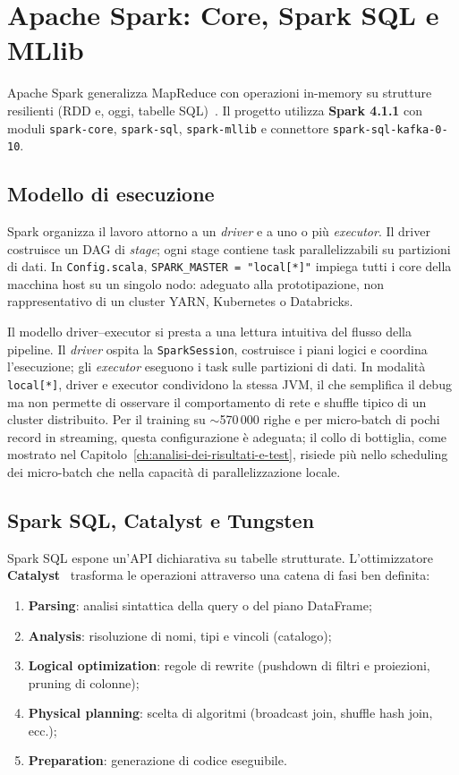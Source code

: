\section{Apache Spark: Core, Spark SQL e MLlib}\label{sec:spark}

Apache Spark generalizza MapReduce con operazioni in-memory su strutture resilienti (RDD e, oggi, tabelle SQL)~\cite{zaharia2010spark,zaharia2016apache}.
Il progetto utilizza \textbf{Spark 4.1.1} con moduli \texttt{spark-core}, \texttt{spark-sql}, \texttt{spark-mllib} e connettore \texttt{spark-sql-kafka-0-10}.

\subsection{Modello di esecuzione}

Spark organizza il lavoro attorno a un \emph{driver} e a uno o più \emph{executor}.
Il driver costruisce un DAG di \emph{stage}; ogni stage contiene task parallelizzabili su partizioni di dati.
In \texttt{Config.scala}, \texttt{SPARK\_MASTER = "local[*]"} impiega tutti i core della macchina host su un singolo nodo: adeguato alla prototipazione, non rappresentativo di un cluster YARN, Kubernetes o Databricks.

Il modello driver--executor si presta a una lettura intuitiva del flusso della pipeline.
Il \emph{driver} ospita la \texttt{SparkSession}, costruisce i piani logici e coordina l'esecuzione; gli \emph{executor} eseguono i task sulle partizioni di dati.
In modalità \texttt{local[*]}, driver e executor condividono la stessa JVM, il che semplifica il debug ma non permette di osservare il comportamento di rete e shuffle tipico di un cluster distribuito.
Per il training su $\sim$570\,000 righe e per micro-batch di pochi record in streaming, questa configurazione è adeguata; il collo di bottiglia, come mostrato nel Capitolo~\ref{ch:analisi-dei-risultati-e-test}, risiede più nello scheduling dei micro-batch che nella capacità di parallelizzazione locale.

\subsection{Spark SQL, Catalyst e Tungsten}\label{subsec:catalyst-tungsten}

Spark SQL espone un'API dichiarativa su tabelle strutturate.
L'ottimizzatore \textbf{Catalyst}~\cite{armbrust2015sparksql} trasforma le operazioni attraverso una catena di fasi ben definita:
\begin{enumerate}
  \item \textbf{Parsing}: analisi sintattica della query o del piano DataFrame;
  \item \textbf{Analysis}: risoluzione di nomi, tipi e vincoli (catalogo);
  \item \textbf{Logical optimization}: regole di rewrite (pushdown di filtri e proiezioni, pruning di colonne);
  \item \textbf{Physical planning}: scelta di algoritmi (broadcast join, shuffle hash join, ecc.);
  \item \textbf{Preparation}: generazione di codice eseguibile.
\end{enumerate}

